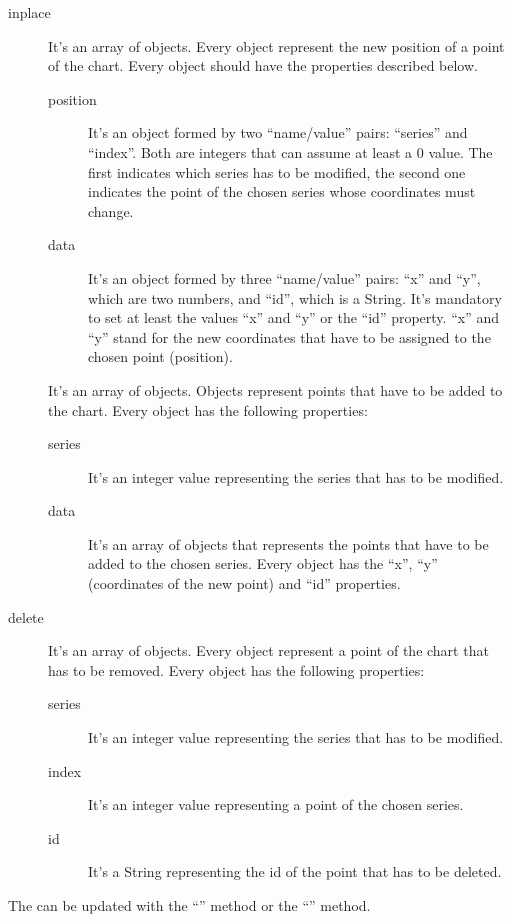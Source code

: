 				\begin{description}
					\item[inplace] It's an array of objects. Every object represent the new position of a point of the chart. Every object should have the properties described below.
					\begin{description}
						\item[position] It's an object formed by two “name/value” pairs: “series” and “index”. Both are integers that can assume at least a 0 value. The first indicates which series has to be modified, the second one indicates the point of the chosen series whose coordinates must change. 
						\item[data] It's an object formed by three “name/value” pairs: “x” and “y”, which are two numbers, and “id”, which is a String. It's mandatory to set at least the values “x” and “y” or the “id” property. “x” and “y” stand for the new coordinates that have to be assigned to the chosen point (position).
					\end{description}
					\item[] It's an array of objects. Objects represent points that have to be added to the chart. Every object has the following properties:
					\begin{description}
						\item[series] It's an integer value representing the series that has to be modified.
						\item[data] It's an array of objects that represents the points that have to be added to the chosen series. Every object has the “x”, “y” (coordinates of the new point) and “id” properties.
					\end{description}
					\item[delete] It's an array of objects. Every object represent a point of the chart that has to be removed. Every object has the following properties:
					\begin{description}
						\item[series] It's an integer value representing the series that has to be modified.
						\item[index] It's an integer value representing a point of the chosen series.
						\item[id] It's a String representing the id of the point that has to be deleted.
					\end{description}
				\end{description}
				The  can be updated with the “” method or the “” method.\\

